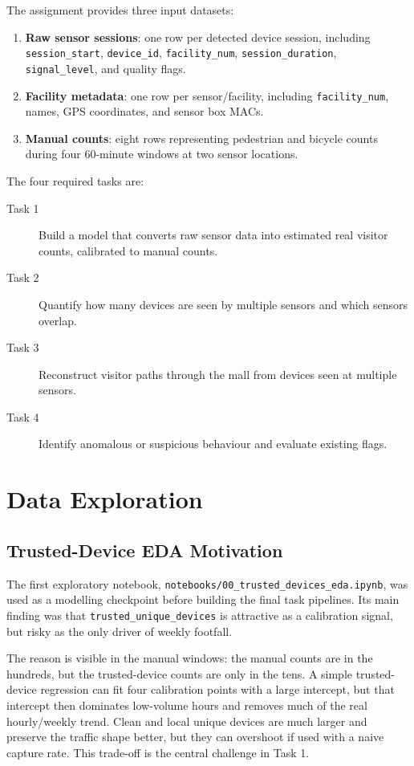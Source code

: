 \documentclass[11pt,a4paper]{article}
\begin{document}
The assignment provides three input datasets:
\begin{enumerate}
  \item \textbf{Raw sensor sessions}: one row per detected device session, including \texttt{session\_start}, \texttt{device\_id}, \texttt{facility\_num}, \texttt{session\_duration}, \texttt{signal\_level}, and quality flags.
  \item \textbf{Facility metadata}: one row per sensor/facility, including \texttt{facility\_num}, names, GPS coordinates, and sensor box MACs.
  \item \textbf{Manual counts}: eight rows representing pedestrian and bicycle counts during four 60-minute windows at two sensor locations.
\end{enumerate}

The four required tasks are:
\begin{description}
  \item[Task 1] Build a model that converts raw sensor data into estimated real visitor counts, calibrated to manual counts.
  \item[Task 2] Quantify how many devices are seen by multiple sensors and which sensors overlap.
  \item[Task 3] Reconstruct visitor paths through the mall from devices seen at multiple sensors.
  \item[Task 4] Identify anomalous or suspicious behaviour and evaluate existing flags.
\end{description}

\section{Data Exploration}

\subsection{Trusted-Device EDA Motivation}

The first exploratory notebook, \texttt{notebooks/00\_trusted\_devices\_eda.ipynb}, was used as a modelling checkpoint before building the final task pipelines. Its main finding was that \texttt{trusted\_unique\_devices} is attractive as a calibration signal, but risky as the only driver of weekly footfall.

The reason is visible in the manual windows: the manual counts are in the hundreds, but the trusted-device counts are only in the tens. A simple trusted-device regression can fit four calibration points with a large intercept, but that intercept then dominates low-volume hours and removes much of the real hourly/weekly trend. Clean and local unique devices are much larger and preserve the traffic shape better, but they can overshoot if used with a naive capture rate. This trade-off is the central challenge in Task 1.
\end{document}
